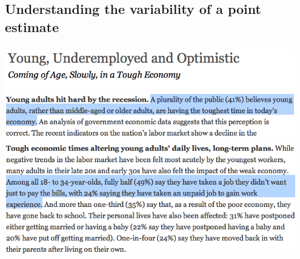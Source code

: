 
\subsection{Understanding the variability of a point estimate}


\begin{frame}
\frametitle{}

\begin{center}
\includegraphics[width=0.95\textwidth]{5-1_point_est_sampling_var/figures/pew/pew1} \\
\includegraphics[width=0.95\textwidth]{5-1_point_est_sampling_var/figures/pew/pew2} \\
\includegraphics[width=0.95\textwidth]{5-1_point_est_sampling_var/figures/pew/pew3}
\end{center}


\end{frame}


